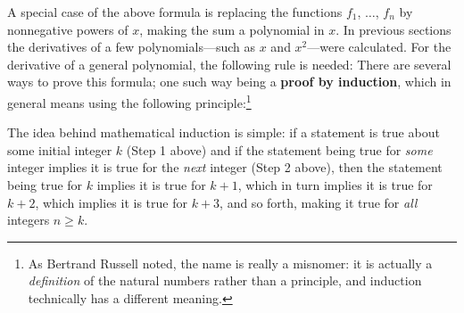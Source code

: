 A special case of the above formula is replacing the functions $f_1$, $\ldots$,
$f_n$ by nonnegative powers of $x$, making the sum a polynomial in $x$. In
previous sections the derivatives of a few polynomials---such as $x$ and
$x^2$---were calculated. For the derivative of a general
polynomial, the following rule is
needed:
There are several ways to prove this formula; one such way being a \textbf{proof
by induction}, which in general means
using the following principle:\footnote{As Bertrand Russell noted, the name is
really a misnomer: it is actually a \emph{definition} of the natural numbers
rather than a principle, and induction technically has a different meaning.}


The idea behind mathematical induction is simple: if a statement is true about
some initial integer $k$ (Step 1 above) and if the statement being true for
\emph{some} integer implies it is true for the \emph{next} integer (Step 2 above),
then the statement being true for $k$ implies it is true for $k+1$, which in turn
implies it is true for $k+2$, which implies it is true for $k+3$, and so forth,
making it true for \emph{all} integers $n \ge k$.

